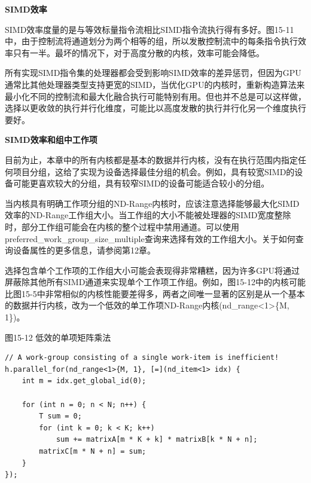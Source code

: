 \hspace*{\fill} \par %
\textbf{SIMD效率}

SIMD效率度量的是与等效标量指令流相比SIMD指令流执行得有多好。图15-11中，由于控制流将通道划分为两个相等的组，所以发散控制流中的每条指令执行效率只有一半。最坏的情况下，对于高度分散的内核，效率可能会降低。\par

所有实现SIMD指令集的处理器都会受到影响SIMD效率的差异惩罚，但因为GPU通常比其他处理器类型支持更宽的SIMD，当优化GPU的内核时，重新构造算法来最小化不同的控制流和最大化融合执行可能特别有用。但也并不总是可以这样做，选择以更收敛的执行并行化维度，可能比以高度发散的执行并行化另一个维度执行要好。\par

\hspace*{\fill} \par %
\textbf{SIMD效率和组中工作项}

目前为止，本章中的所有内核都是基本的数据并行内核，没有在执行范围内指定任何项目分组，这给了实现为设备选择最佳分组的机会。例如，具有较宽SIMD的设备可能更喜欢较大的分组，具有较窄SIMD的设备可能适合较小的分组。\par

当内核具有明确工作项分组的ND-Range内核时，应该注意选择能够最大化SIMD效率的ND-Range工作组大小。当工作组的大小不能被处理器的SIMD宽度整除时，部分工作组可能会在内核的整个过程中禁用通道。可以使用preferred\_work\_group\_size\_multiple查询来选择有效的工作组大小。关于如何查询设备属性的更多信息，请参阅第12章。\par

选择包含单个工作项的工作组大小可能会表现得非常糟糕，因为许多GPU将通过屏蔽除其他所有SIMD通道来实现单个工作项工作组。例如，图15-12中的内核可能比图15-5中非常相似的内核性能要差得多，两者之间唯一显著的区别是从一个基本的数据并行内核，改为一个低效的单工作项ND-Range内核(nd\_range<1>\{M, 1\})。\par

\hspace*{\fill} \par %
图15-12 低效的单项矩阵乘法
\begin{lstlisting}[caption={}]
// A work-group consisting of a single work-item is inefficient!
h.parallel_for(nd_range<1>{M, 1}, [=](nd_item<1> idx) {
	int m = idx.get_global_id(0);
	
	for (int n = 0; n < N; n++) {
		T sum = 0;
		for (int k = 0; k < K; k++)
			sum += matrixA[m * K + k] * matrixB[k * N + n];
		matrixC[m * N + n] = sum;
	}
});
\end{lstlisting}

